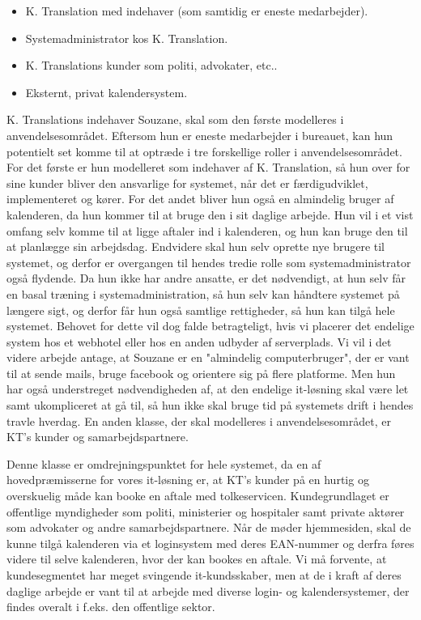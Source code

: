 \documentclass[12pt]{article}   %
\begin{document}
\begin{itemize}
\item K. Translation med indehaver (som samtidig er eneste medarbejder).
\item Systemadministrator kos K. Translation.
\item K. Translations kunder som politi, advokater, etc..
\item Eksternt, privat kalendersystem.
\end{itemize}

K. Translations indehaver Souzane, skal som den første modelleres i anvendelsesområdet. Eftersom hun er eneste medarbejder i bureauet, kan hun potentielt set komme til at optræde i tre forskellige roller i anvendelsesområdet. For det første er hun modelleret som indehaver af K. Translation, så hun over for sine kunder bliver den ansvarlige for systemet, når det er færdigudviklet, implementeret og kører. For det andet bliver hun også en almindelig bruger af kalenderen, da hun kommer til at bruge den i sit daglige arbejde. Hun vil i et vist omfang selv komme til at ligge aftaler ind i kalenderen, og hun kan bruge den til at planlægge sin arbejdsdag. Endvidere skal hun selv oprette nye brugere til systemet, og derfor er overgangen til hendes tredie rolle som systemadministrator også flydende. Da hun ikke har andre ansatte, er det nødvendigt, at hun selv får en basal træning i systemadministration, så hun selv kan håndtere systemet på længere sigt, og derfor får hun også samtlige rettigheder, så hun kan tilgå hele systemet. Behovet for dette vil dog falde betragteligt, hvis vi placerer det endelige system hos et webhotel eller hos en anden udbyder af serverplads. Vi vil i det videre arbejde antage, at Souzane er en "almindelig computerbruger", der er vant til at sende mails, bruge facebook og orientere sig på flere platforme. Men hun har også understreget nødvendigheden af, at den endelige it-løsning skal være let samt ukompliceret at gå til, så hun ikke skal bruge tid på systemets drift i hendes travle hverdag.
En anden klasse, der skal modelleres i anvendelsesområdet, er KT's kunder og samarbejdspartnere.

 Denne klasse er omdrejningspunktet for hele systemet, da
en af hovedpræmisserne for vores it-løsning er, at KT's kunder på en hurtig og
overskuelig måde kan booke en aftale med tolkeservicen. Kundegrundlaget er  
offentlige myndigheder som politi, ministerier og hospitaler samt private
aktører som advokater og andre samarbejdspartnere. Når de møder hjemmesiden, skal
de kunne tilgå kalenderen via et loginsystem med deres EAN-nummer og derfra
føres videre til selve kalenderen, hvor der kan bookes en aftale. Vi må
forvente, at kundesegmentet har meget svingende it-kundsskaber, men at de i
kraft af deres daglige arbejde er vant til at arbejde med diverse login- og 
kalendersystemer, der findes overalt i f.eks. den offentlige sektor. \\
\end{document}
